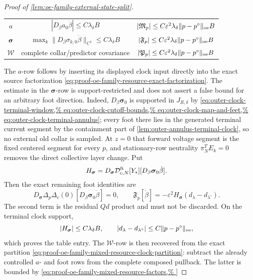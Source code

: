 \begin{proof}[Proof of
\cref{lem:oe-family-external-state-split}]
\begin{center}
\begin{tabular}{c|c|c}
\(a\) &
 \(|D_\beta a_0\dot\beta|\le C\lambda_\delta B\) &
 \(|\mathfrak M_p|\le
   C\varepsilon^2\lambda_\delta
       \|p-p^\circ\|_{\rm oe}B\)\\
\(\boldsymbol\sigma\) &
 \(\max_k\|D_\beta\sigma_{k,0}\dot\beta\|_{C^1}
       \le C\lambda_\delta B\) &
 \(|\mathfrak F_p|\le
   C\varepsilon^2\lambda_\delta
       \|p-p^\circ\|_{\rm oe}B\)\\
\(\mathscr W\) &
 complete collar/predictor covariance &
 \(|\mathfrak P_p|\le
   C\varepsilon^2\lambda_\delta
       \|p-p^\circ\|_{\rm oe}B\)
\end{tabular}
\end{center}
The \(a\)-row follows by inserting its displayed clock input directly
into the exact source factorization
\cref{eq:proof-oe-family-resource-exact-factorization}.  The estimate in
the \(\boldsymbol\sigma\)-row is support-restricted and does not assert a
false bound for an arbitrary foot direction.  Indeed,
\(D_\beta\boldsymbol\sigma_0\) is supported in \(J_{R,\delta}\) by
\cref{eq:outer-clock-terminal-window,%
eq:outer-clock-cutoff-bounds,%
eq:outer-clock-map-and-feet,%
eq:outer-clock-terminal-annulus}; every foot there lies in the generated
terminal current segment by the containment part of
\cref{lem:outer-annulus-terminal-clock}, so no external old collar is
sampled.  At
\(z=0\) that forward voltage segment is the fixed centered segment for
every \(p\), and stationary-row neutrality
\(\pi_N^TE_k=0\) removes the direct collective layer change.  Put
\[
 H_{\boldsymbol\sigma}
 =D_{\boldsymbol\sigma}\mathcal D_{c,N}^{\rm ft}[Y_*]
       [D_\beta\boldsymbol\sigma_0\dot\beta].
\]
Then the exact remaining foot identities are
\begin{equation}
 D_{\boldsymbol\sigma}\Delta_p\Delta_c(0)
       [D_\beta\boldsymbol\sigma_0\dot\beta]=0,
 \qquad
 \mathfrak F_p[\dot\beta]
 =-\varepsilon^2H_{\boldsymbol\sigma}
       (d_\lambda-d_{\lambda^\circ}).          \label{eq:proof-oe-family-mixed-resource-actual-foot}
\end{equation}
The second term is the residual \(Qd\) product and must not be discarded.
On the terminal clock support,
\[
 |H_{\boldsymbol\sigma}|\le C\lambda_\delta B,
 \qquad
 |d_\lambda-d_{\lambda^\circ}|
 \le C\|p-p^\circ\|_{\rm oe},
\]
which proves the table entry.  The \(\mathscr W\)-row is then recovered
from the exact partition
\cref{eq:proof-oe-family-mixed-resource-clock-partition}: subtract the
already controlled \(a\)- and foot rows from the complete
composed pullback.  The latter is bounded by
\cref{eq:proof-oe-family-mixed-resource-factors,%
}
\end{proof}
